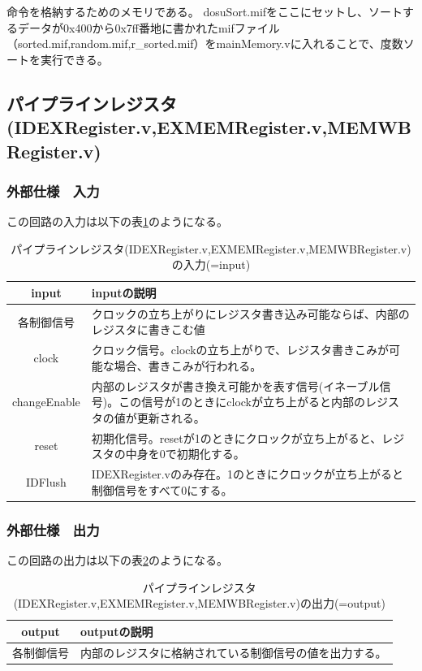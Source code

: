 \documentclass[a4j,titlepage]{jarticle}
\begin{document}
命令を格納するためのメモリである。
dosuSort.mifをここにセットし、ソートするデータが0x400から0x7ff番地に書かれたmifファイル（sorted.mif,random.mif,r\_sorted.mif）をmainMemory.vに入れることで、度数ソートを実行できる。


\newpage
\subsection{パイプラインレジスタ(IDEXRegister.v,EXMEMRegister.v,MEMWBRegister.v)}

\subsubsection{外部仕様　入力}
この回路の入力は以下の表\ref{pipelineRegisterI}のようになる。
\begin{table}[H]
    \caption{パイプラインレジスタ(IDEXRegister.v,EXMEMRegister.v,MEMWBRegister.v)の入力(=input)}
    \label{pipelineRegisterI}
    \begin{center}
    \begin {tabularx}{150mm}{|c|X|} \hline
         input & inputの説明 \\ \hline \hline
	 各制御信号 & クロックの立ち上がりにレジスタ書き込み可能ならば、内部のレジスタに書きこむ値\\ \hline
     clock & クロック信号。clockの立ち上がりで、レジスタ書きこみが可能な場合、書きこみが行われる。\\ \hline %
     changeEnable & 内部のレジスタが書き換え可能かを表す信号(イネーブル信号)。この信号が1のときにclockが立ち上がると内部のレジスタの値が更新される。 \\ \hline
     reset & 初期化信号。resetが1のときにクロックが立ち上がると、レジスタの中身を0で初期化する。\\ \hline
     IDFlush & IDEXRegister.vのみ存在。1のときにクロックが立ち上がると制御信号をすべて0にする。\\ \hline
    \end{tabularx}
    \end{center}
\end{table}

\subsubsection{外部仕様　出力}
この回路の出力は以下の表\ref{pipelineRegisterO}のようになる。
\begin{table}[H]
    \caption{パイプラインレジスタ(IDEXRegister.v,EXMEMRegister.v,MEMWBRegister.v)の出力(=output)}
    \label{pipelineRegisterO}
    \begin{center}
    \begin {tabularx}{150mm}{|c|X|} \hline
     output & outputの説明 \\ \hline \hline
	 各制御信号 & 内部のレジスタに格納されている制御信号の値を出力する。\\ \hline %
\end {tabularx}
    \end{center}
\end{table}
\end{document}
